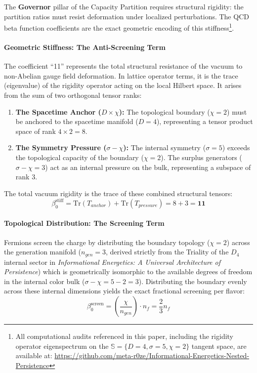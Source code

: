 The \textbf{Governor} pillar of the Capacity Partition requires structural rigidity: the partition ratios must resist deformation under localized perturbations. The QCD beta function coefficients are the exact geometric encoding of this stiffness\footnote{All computational audits referenced in this paper, including the rigidity operator eigenspectrum on the $\mathbb{S} = \{D=4, \sigma=5, \chi=2\}$ tangent space, are available at: \url{https://github.com/meta-r0ze/Informational-Energetics-Nested-Persistence}}.

\paragraph{Geometric Stiffness: The Anti-Screening Term}
The coefficient ``11'' represents the total structural resistance of the vacuum to non-Abelian gauge field deformation. In lattice operator terms, it is the trace (eigenvalue) of the rigidity operator acting on the local Hilbert space. It arises from the sum of two orthogonal tensor ranks:
\begin{enumerate}
    \item \textbf{The Spacetime Anchor ($D \times \chi$):} The topological boundary ($\chi=2$) must be anchored to the spacetime manifold ($D=4$), representing a tensor product space of rank $4 \times 2 = 8$.
    \item \textbf{The Symmetry Pressure ($\sigma - \chi$):} The internal symmetry ($\sigma=5$) exceeds the topological capacity of the boundary ($\chi=2$). The surplus generators ($\sigma - \chi = 3$) act as an internal pressure on the bulk, representing a subspace of rank $3$.
\end{enumerate}
The total vacuum rigidity is the trace of these combined structural tensors:
\begin{equation}
    \beta_0^{\text{stiff}} = \text{Tr}(T_{anchor}) + \text{Tr}(T_{pressure}) = 8 + 3 = \mathbf{11}
\end{equation}

\paragraph{Topological Distribution: The Screening Term}
Fermions screen the charge by distributing the boundary topology ($\chi=2$) across the generation manifold ($n_{gen}=3$, derived strictly from the Triality of the $D_4$ internal sector in \textit{Informational Energetics: A Universal Architecture of Persistence}\cite{meyer_informational_2026}) which is geometrically isomorphic to the available degrees of freedom in the internal color bulk ($\sigma - \chi = 5 - 2 = 3$). Distributing the boundary evenly across these internal dimensions yields the exact fractional screening per flavor:
\begin{equation}
    \beta_0^{\text{screen}} = \left( \frac{\chi}{n_{gen}} \right) \cdot n_f = \frac{2}{3} n_f
\end{equation}

